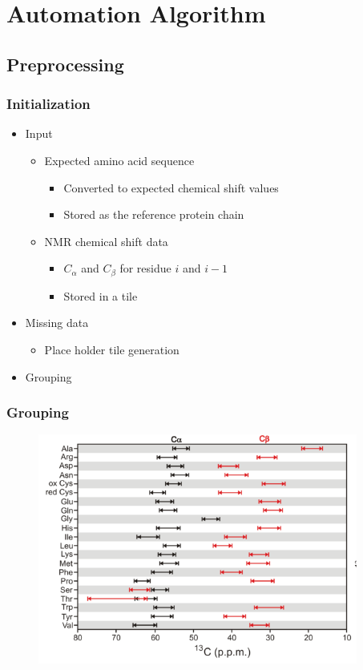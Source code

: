 \documentclass{beamer}
\begin{document}
\section{Automation Algorithm}

\subsection{Preprocessing}

\begin{frame}
	\frametitle{Initialization}
	\begin{itemize}
		\item Input
		\begin{itemize}
			\item Expected amino acid sequence
			\begin{itemize}
				\item Converted to expected chemical shift values
				\item Stored as the reference protein chain
			\end{itemize}
			\item NMR chemical shift data
			\begin{itemize}
				\item $C_\alpha$ and $C_{\beta}$ for residue $i$ and $i-1$
				\item Stored in a tile
			\end{itemize}
		\end{itemize}
		\item Missing data
		\begin{itemize}
			\item Place holder tile generation
		\end{itemize}
		\item Grouping 
	\end{itemize}
\end{frame}

\begin{frame}
	\frametitle{Grouping}
	\begin{figure}[H]
	\begin{center}
	\includegraphics[width=.65\textwidth]{carbon}
	\end{center}
	\end{figure}
\hfill \scriptsize\cite{carbon}
\end{frame}
\end{document}
